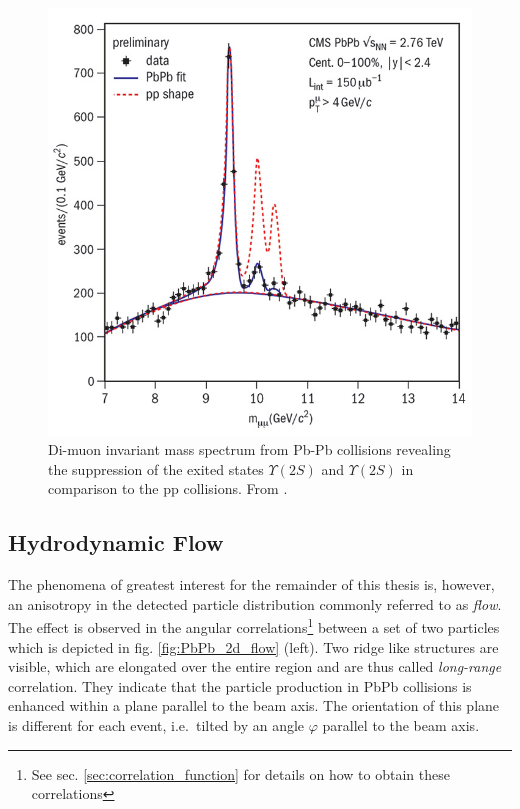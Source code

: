 \begin{figure}
  \centering
  \includegraphics[width=.6\textwidth]{figures/upsilon.jpg}
  \caption[Di-muon invariant mass spectrum from Pb-Pb collisions revealing the suppression of the exited states $\Upsilon(2S)$ and $\Upsilon(2S)$.]{Di-muon invariant mass spectrum from Pb-Pb collisions revealing the suppression of the exited states $\Upsilon(2S)$ and $\Upsilon(2S)$ in comparison to the pp collisions. From \cite{Velkovska2012}.}
  \label{fig:upsilon_suppression}
\end{figure}

\subsection{Hydrodynamic Flow}
\label{sec:flow}

The phenomena of greatest interest for the remainder of this thesis is, however, an anisotropy in the detected particle distribution commonly referred to as \emph{flow}. The effect is observed in the angular correlations\footnote{See sec. \ref{sec:correlation_function} for details on how to obtain these correlations} between a set of two particles which is depicted in fig. \ref{fig:PbPb_2d_flow} (left). Two ridge like structures are visible,  which are elongated over the entire \deta region and are thus called \emph{long-range} correlation. They indicate that the particle production in \gls{PbPb} collisions is enhanced within a plane parallel to the beam axis. The orientation of this plane is different for each event, i.e.\ tilted by an angle $\varphi$ parallel to the beam axis.

